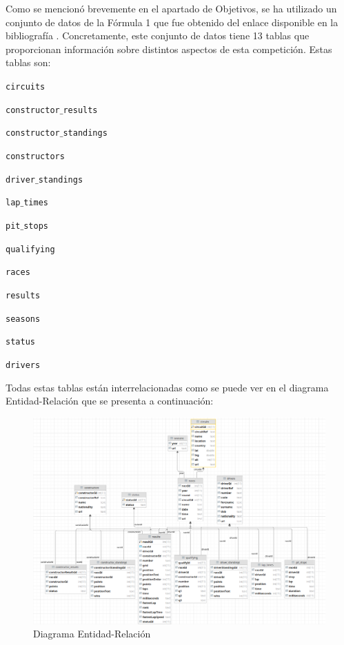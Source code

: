 \documentclass[12pt,twoside,titlepage]{report}
\begin{document}
Como se mencionó brevemente en el apartado de Objetivos, se ha utilizado un conjunto de datos de la Fórmula 1 que fue obtenido del enlace disponible en la bibliografía \cite{datasource}. Concretamente, este conjunto de datos tiene 13 tablas que proporcionan información sobre distintos aspectos de esta competición. Estas tablas son:

\begin{compactitem}
  \item \texttt{circuits}
  \item \texttt{constructor$\_$results}
  \item \texttt{constructor$\_$standings}
  \item \texttt{constructors}
  \item \texttt{driver$\_$standings}
  \item \texttt{lap$\_$times}
  \item \texttt{pit$\_$stops}
  \item \texttt{qualifying}
  \item \texttt{races}
  \item \texttt{results}
  \item \texttt{seasons}
  \item \texttt{status}
  \item \texttt{drivers}
\end{compactitem}

Todas estas tablas están interrelacionadas como se puede ver en el diagrama Entidad-Relación que se presenta a continuación:

\begin{figure}[H]
  \includegraphics[scale=0.4]{dataset_visualization.png}
  \centering
  \caption{Diagrama Entidad-Relación}
  \label{fig:datavisualization}
  \centering
\end{figure}
\end{document}
